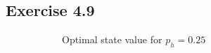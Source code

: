 \documentclass[10pt]{article}
\begin{document}
 	\subsection*{Exercise 4.9}
 	\label{ss:4.9}
 	\begin{figure}[H]
 		\centering
 		\begin{subfigure}{0.45\textwidth}
 			\caption{Optimal state value for $p_h=0.25$}
 		\end{subfigure}
 		\begin{subfigure}{0.45\textwidth}

\end{subfigure}
\end{figure}
\end{document}
